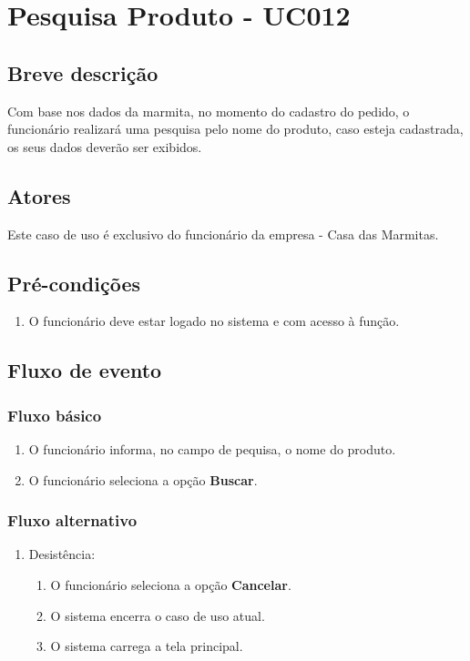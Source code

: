 \chapter{Pesquisa Produto - UC012} \label{uc012}

\section{Breve descrição}

Com base nos dados da marmita, no momento do cadastro do pedido, o funcionário realizará uma pesquisa pelo nome do produto, caso esteja cadastrada, os seus dados deverão ser exibidos.

\section{Atores}

Este caso de uso é exclusivo do funcionário da empresa - Casa das Marmitas.

\section{Pré-condições}

\begin{enumerate}
	\item O funcionário deve estar logado no sistema e com acesso à função.
\end{enumerate}

\section{Fluxo de evento}

\subsection{Fluxo básico}

\begin{enumerate}
	\item O funcionário informa, no campo de pequisa, o nome do produto.
	\item O funcionário seleciona a opção \textbf{Buscar}.
\end{enumerate}

\subsection{Fluxo alternativo}

\begin{enumerate}
	\item Desistência:
	\begin{enumerate}
		\item O funcionário seleciona a opção \textbf{Cancelar}.
		\item O sistema encerra o caso de uso atual.
		\item O sistema carrega a tela principal.
	\end{enumerate}
\end{enumerate}


